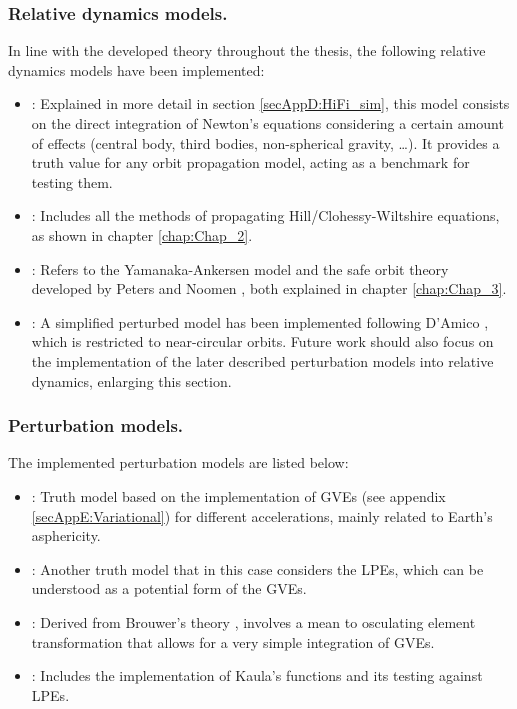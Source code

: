 		\subsubsection{Relative dynamics models.}
		\indent In line with the developed theory throughout the thesis, the following relative dynamics models have been implemented:
		\begin{itemize}
		\item[\GMVred{I.}] : Explained in more detail in section \ref{secAppD:HiFi_sim}, this model consists on the direct integration of Newton's equations considering a certain amount of effects (central body, third bodies, non-spherical gravity, \ldots). It provides a truth value for any orbit propagation model, acting as a benchmark for testing them.
		\item[\GMVred{II.}] : Includes all the methods of propagating Hill/Clohessy-Wiltshire equations, as shown in chapter \ref{chap:Chap_2}.
		\item[\GMVred{III.}] : Refers to the Yamanaka-Ankersen \cite{Yamanaka_Ankersen} model and the safe orbit theory developed by Peters and Noomen \cite{Peters_Noomen}, both explained in chapter \ref{chap:Chap_3}.
		\item[\GMVred{IV.}] : A simplified perturbed model has been implemented following D'Amico \cite{dAmicoDLR}, which is restricted to near-circular orbits. Future work should also focus on the implementation of the later described perturbation models into relative dynamics, enlarging this section.
		\end{itemize}
		\subsubsection{Perturbation models.}
		\indent The implemented perturbation models are listed below:
		\begin{itemize}
		\item[\GMVred{I.}] : Truth model based on the implementation of GVEs (see appendix \ref{secAppE:Variational}) for different accelerations, mainly related to Earth's asphericity.
		\item[\GMVred{II.}] : Another truth model that in this case considers the LPEs, which can be understood as a potential form of the GVEs. 
		\item[\GMVred{III.}] \cite{GA_STM}: Derived from Brouwer's theory \cite{Brouwer}, involves a mean to osculating element transformation that allows for a very simple integration of GVEs.
		\item[\GMVred{IV.}] \cite{Kaula}: Includes the implementation of Kaula's functions and its testing against LPEs.
		\end{itemize}
